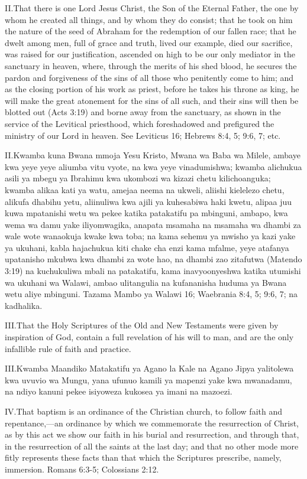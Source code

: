 \lettrine{II.} That there is one Lord Jesus Christ, the Son of the Eternal Father, the one by whom he created all things, and by whom they do consist; that he took on him the nature of the seed of Abraham for the redemption of our fallen race; that he dwelt among men, full of grace and truth, lived our example, died our sacrifice, was raised for our justification, ascended on high to be our only mediator in the sanctuary in heaven, where, through the merits of his shed blood, he secures the pardon and forgiveness of the sins of all those who penitently come to him; and as the closing portion of his work as priest, before he takes his throne as king, he will make the great atonement for the sins of all such, and their sins will then be blotted out (Acts 3:19) and borne away from the sanctuary, as shown in the service of the Levitical priesthood, which foreshadowed and prefigured the ministry of our Lord in heaven. See Leviticus 16; Hebrews 8:4, 5; 9:6, 7; etc.


\lettrine{II.} Kwamba kuna Bwana mmoja Yesu Kristo, Mwana wa Baba wa Milele, ambaye kwa yeye yeye aliumba vitu vyote, na kwa yeye vinadumishwa; kwamba alichukua asili ya mbegu ya Ibrahimu kwa ukombozi wa kizazi chetu kilichoanguka; kwamba alikaa kati ya watu, amejaa neema na ukweli, aliishi kielelezo chetu, alikufa dhabihu yetu, aliinuliwa kwa ajili ya kuhesabiwa haki kwetu, alipaa juu kuwa mpatanishi wetu wa pekee katika patakatifu pa mbinguni, ambapo, kwa wema wa damu yake iliyomwagika, anapata msamaha na msamaha wa dhambi za wale wote wanaokuja kwake kwa toba; na kama sehemu ya mwisho ya kazi yake ya ukuhani, kabla hajachukua kiti chake cha enzi kama mfalme, yeye atafanya upatanisho mkubwa kwa dhambi za wote hao, na dhambi zao zitafutwa (Matendo 3:19) na kuchukuliwa mbali na patakatifu, kama inavyoonyeshwa katika utumishi wa ukuhani wa Walawi, ambao ulitangulia na kufananisha huduma ya Bwana wetu aliye mbinguni. Tazama Mambo ya Walawi 16; Waebrania 8:4, 5; 9:6, 7; na kadhalika.


\lettrine{III.} That the Holy Scriptures of the Old and New Testaments were given by inspiration of God, contain a full revelation of his will to man, and are the only infallible rule of faith and practice.


\lettrine{III.} Kwamba Maandiko Matakatifu ya Agano la Kale na Agano Jipya yalitolewa kwa uvuvio wa Mungu, yana ufunuo kamili ya mapenzi yake kwa mwanadamu, na ndiyo kanuni pekee isiyoweza kukosea ya imani na mazoezi.


\lettrine{IV.} That baptism is an ordinance of the Christian church, to follow faith and repentance,—an ordinance by which we commemorate the resurrection of Christ, as by this act we show our faith in his burial and resurrection, and through that, in the resurrection of all the saints at the last day; and that no other mode more fitly represents these facts than that which the Scriptures prescribe, namely, immersion. Romans 6:3-5; Colossians 2:12.



